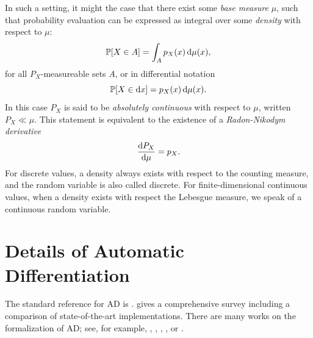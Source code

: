 In such a setting, it might the case that there exist some \emph{base measure} \(\mu\), such that
probability evaluation can be expressed as integral over some \emph{density} with respect to \(\mu\):
\begin{equation}
  \label{eq:measure-integral}
  \Prob{X \in A} = \int_{A} \prob[X]{x} \dif\mu(x),
\end{equation}
for all \(P_X\)-measureable sets \(A\), or in differential notation
\begin{equation}
  \label{eq:measure-differential}
  \Prob{X \in \dif x} = \prob[X]{x} \dif\mu(x).
\end{equation}
In this case \(P_X\) is said to be \emph{absolutely continuous} with respect to \(\mu\), written
\(P_X \ll \mu\).  This statement is equivalent to the existence of a \emph{Radon-Nikodym derivative}
\begin{equation}
  \label{eq:radon-nikodym}
  \frac{\dif P_{X}}{\dif \mu} = p_{X}.
\end{equation}
For discrete values, a density always exists with respect to the counting measure, and the random
variable is also called discrete.  For finite-dimensional continuous values, when a density exists
with respect the Lebesgue measure, we speak of a continuous random variable. 




\chapter{Details of Automatic Differentiation}
\label{ch:ad-details}

The standard reference for AD is \textcite{griewank2008evaluating}.  \textcite{baydin2018automatic}
gives a comprehensive survey including a comparison of state-of-the-art implementations.  There are
many works on the formalization of AD; see, for example, \textcite{abadi2020simple},
\textcite{vytiniotis2019differentiable}, \textcite{wang2019demystifying},
\textcite{sajovic2016operational}, or \textcite{elliott2018simple}.

